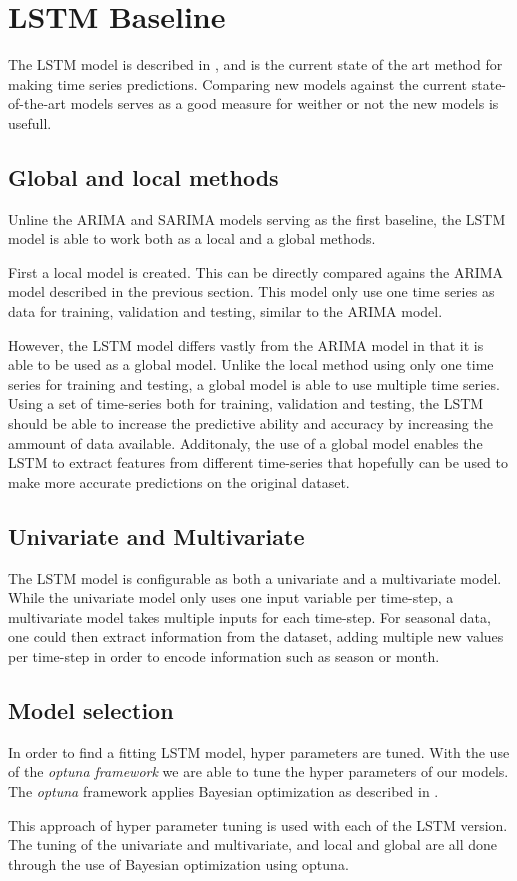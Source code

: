 
\section{LSTM Baseline}
\label{section:Architecture:Baselines:LSTM}

The LSTM model is described in , and is the current state of the art method for making time series predictions.
Comparing new models against the current state-of-the-art models serves as a good measure for weither or not the new models is usefull.

\subsection{Global and local methods}
Unline the ARIMA and SARIMA models serving as the first baseline,
the LSTM model is able to work both as a local and a global methods.

First a local model is created. This can be directly compared agains the ARIMA model described in the previous section.
This model only use one time series as data for training, validation and testing, similar to the ARIMA model.

However, the LSTM model differs vastly from the ARIMA model in that it is able to be used as a global model.
Unlike the local method using only one time series for training and testing,
a global model is able to use multiple time series.
Using a set of time-series both for training, validation and testing,
the LSTM should be able to increase the predictive ability and accuracy by increasing the ammount of data available.
Additonaly, the use of a global model enables the LSTM to extract features from different time-series that hopefully can be used to make more accurate predictions on the original dataset.

\subsection{Univariate and Multivariate}
The LSTM model is configurable as both a univariate and a multivariate model.
While the univariate model only uses one input variable per time-step, a multivariate model takes multiple inputs for each time-step.
For seasonal data, one could then extract information from the dataset, adding multiple new values per time-step in order to encode information such as season or month.

\subsection{Model selection}
In order to find a fitting LSTM model, hyper parameters are tuned.
With the use of the \textit{optuna framework} %
we are able to tune the hyper parameters of our models.
The \textit{optuna} framework applies Bayesian optimization as described in .

This approach of hyper parameter tuning is used with each of the LSTM version.
The tuning of the univariate and multivariate, and local and global are all done through the use of Bayesian optimization using optuna.


